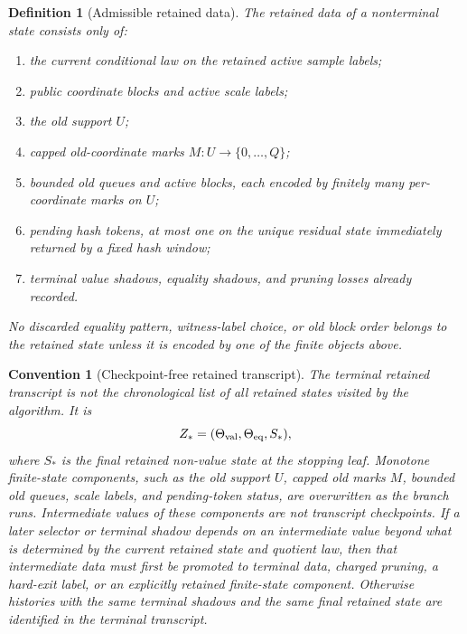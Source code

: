 \documentclass[11pt]{article}
\newtheorem{definition}[theorem]{Definition}
\newtheorem{convention}[theorem]{Convention}
\theoremstyle{remark}
\begin{document}
\begin{definition}[Admissible retained data]
The retained data of a nonterminal state consists only of:
\begin{enumerate}[label=\textup{(\roman*)}]
\item the current conditional law on the retained active sample labels;
\item public coordinate blocks and active scale labels;
\item the old support $U$;
\item capped old-coordinate marks $M:U\to\{0,\ldots,Q\}$;
\item bounded old queues and active blocks, each encoded by finitely many per-coordinate marks on $U$;
\item pending hash tokens, at most one on the unique residual state immediately returned by a fixed hash window;
\item terminal value shadows, equality shadows, and pruning losses already recorded.
\end{enumerate}
No discarded equality pattern, witness-label choice, or old block order belongs to the retained state unless it is encoded by one of the finite objects above.
\end{definition}

\begin{convention}[Checkpoint-free retained transcript]\label{conv:checkpoint-free}
The terminal retained transcript is not the chronological list of all retained states visited by the algorithm.  It is
\[
        Z_*=(\Theta_{\rm val},\Theta_{\rm eq},S_*),
\]
where $S_*$ is the final retained non-value state at the stopping leaf.  Monotone finite-state components, such as the old support $U$, capped old marks $M$, bounded old queues, scale labels, and pending-token status, are overwritten as the branch runs.  Intermediate values of these components are not transcript checkpoints.  If a later selector or terminal shadow depends on an intermediate value beyond what is determined by the current retained state and quotient law, then that intermediate data must first be promoted to terminal data, charged pruning, a hard-exit label, or an explicitly retained finite-state component.  Otherwise histories with the same terminal shadows and the same final retained state are identified in the terminal transcript.
\end{convention}
\end{document}
